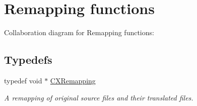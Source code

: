 \hypertarget{group__CINDEX__REMAPPING}{}\section{Remapping functions}
\label{group__CINDEX__REMAPPING}
Collaboration diagram for Remapping functions\+:
\subsection*{Typedefs}
\begin{DoxyCompactItemize}
\item 
\mbox{\label{group__CINDEX__REMAPPING_ga04be0aca9e36a130cf1dd6fd8cbd4408}} 
typedef void $\ast$ \hyperlink{group__CINDEX__REMAPPING_ga04be0aca9e36a130cf1dd6fd8cbd4408}{C\+X\+Remapping}
\begin{DoxyCompactList}\small\item\em A remapping of original source files and their translated files. \end{DoxyCompactList}\end{DoxyCompactItemize}
